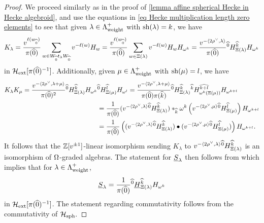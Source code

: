 \begin{proof}
    We proceed similarly as in the proof of \cref{lemma affine spherical Hecke in Hecke algebroid}, and use the equations in \cref{eq Hecke multiplication length zero elements} to see that  
    given $\lambda \in \Lambda_{\operatorname{weight}}^+$ with $\operatorname{sh}(\lambda)=k$, we have
    $$K_\lambda
    = \frac{v^{\ell(w_{\widehat{0}})}}{\pi(\widehat{0})} \sum_{w\in W_{\widehat{0}}t_\lambda W_{\widehat{0}}}v^{-\ell(w)}H_w 
    = \frac{v^{\ell(w_{\widehat{0}})}}{\pi(\widehat{0})} \sum_{w\in \Xi(\lambda)}v^{-\ell(w)}H_w H_{\omega^k}
    = \frac{v^{-\langle2 \rho^\vee, \lambda \rangle}}{\pi(\widehat{0})} {}^{\widehat{0}}H^{\widehat{k}}_{\Xi(\lambda)} H_{\omega^k}$$
    in $\mathcal{H}_{\operatorname{ext}}[\pi(\widehat{0})^{-1}]$.
    Additionally, given $\mu \in \Lambda_{\operatorname{weight}}^+$ with $\operatorname{sh}(\mu)=l$, we have
    \begin{align*}
    K_\lambda K_\mu
    =\frac{v^{-\langle 2 \rho^\vee, \lambda+\mu \rangle}}{\pi(\widehat{0})^2} {}^{\widehat{0}}H^{\widehat{k}}_{\Xi(\lambda)}H_{\omega^k} &{}^{\widehat{0}}H^{\widehat{l}}_{\Xi(\mu)}H_{\omega^l}
    =\frac{v^{-\langle 2 \rho^\vee, \lambda+\mu \rangle}}{\pi(\widehat{0})\pi(\widehat{k})} {}^{\widehat{0}}H^{\widehat{k}}_{\Xi(\lambda)}{}^{\widehat{k}}H^{\widehat{k+l}}_{\omega^k({\Xi(\mu)})}H_{\omega^{k+l}}\\
    &=\frac{1}{\pi(\widehat{0})}(v^{-\langle 2\rho^\vee, \lambda \rangle} {}^{\widehat{0}}H^{\widehat{k}}_{\Xi(\lambda)})
    \ast_{\widehat{k}}\omega^k \left(v^{-\langle 2\rho^\vee, \mu \rangle} {}^{\widehat{0}}H^{\widehat{l}}_{\Xi(\mu)}\right)H_{\omega^{k+l}}\\
    &=\frac{1}{\pi(\widehat{0})}\left((v^{-\langle 2\rho^\vee, \lambda \rangle} {}^{\widehat{0}}H^{\widehat{k}}_{\Xi(\lambda)})
    \bullet (v^{-\langle 2\rho^\vee, \mu \rangle} {}^{\widehat{0}}H^{\widehat{l}}_{\Xi(\mu)})\right)H_{\omega^{k+l}}.
\end{align*}
It follows that the $\mathbb{Z}[v^{\pm 1}]$-linear isomorphism sending $K_\lambda$ to $v^{-\langle2 \rho^\vee, \lambda \rangle} {}^{\widehat{0}}H^{\widehat{k}}_{\Xi(\lambda)}$ is an isomorphism of $\Omega$-graded algebras.
The statement for $\underline{S}_{\lambda}$ then follows from \cite[Theorem 6.12]{LusztigGS} which implies that for $\lambda \in \Lambda_{\operatorname{weight}}^+$,
$$\underline{S}_{\lambda}= \frac{1}{\pi(\widehat{0})}{}^{\widehat{0}}\underline{H}^{\widehat{k}}_{\Xi(\lambda)}H_{\omega^k}$$
in $\mathcal{H}_{\operatorname{ext}}[\pi(\widehat{0})^{-1}]$.
The statement regarding commutativity follows from the commutativity of $\mathcal{H}_{\operatorname{sph}}.$
\end{proof}


